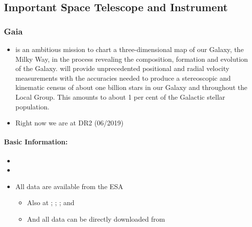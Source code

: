 \documentclass[letterpaper,10pt,english]{sphinxmanual}
\begin{document}
\subsection{Important Space Telescope and Instrument}
\label{\detokenize{astro_project:important-space-telescope-and-instrument}}

\subsubsection{Gaia}
\label{\detokenize{resource/astro/projects/gaia:gaia}}\label{\detokenize{resource/astro/projects/gaia::doc}}\begin{itemize}
\item {} 
 is an ambitious mission to chart a three-dimensional map of
our Galaxy, the Milky Way, in the process revealing the composition,
formation and evolution of the Galaxy.  will provide
unprecedented positional and radial velocity measurements with the
accuracies needed to produce a stereoscopic and kinematic census of
about one billion stars in our Galaxy and throughout the Local Group.
This amounts to about 1 per cent of the Galactic stellar population.

\item {} 
Right now we are at  DR2 (06/2019)

\end{itemize}


\paragraph{Basic Information:}
\label{\detokenize{resource/astro/projects/gaia:basic-information}}\begin{itemize}
\item {} 

\item {} 

\item {} 
All data are available from the ESA 
\begin{itemize}
\item {} 
Also at ; ; ; and 

\item {} 
And all  data can be directly downloaded from 

\end{itemize}

\end{itemize}
\end{document}
